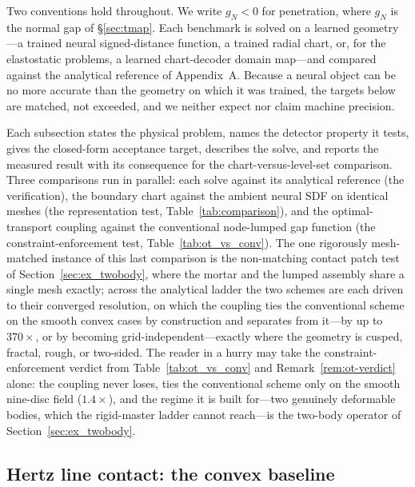 \documentclass{svjour3}                 %
\newcommand{\gn}{g_{\scriptscriptstyle N}}
\begin{document}
Two conventions hold throughout. We write $\gn<0$ for penetration, where $\gn$ is the normal gap of
\S\ref{sec:tmap}. Each benchmark is solved on a learned geometry---a trained neural signed-distance function,
a trained radial chart, or, for the elastostatic problems, a learned chart-decoder domain map---and compared
against the analytical reference of Appendix~A. Because a neural object can be no more accurate than the
geometry on which it was trained, the targets below are matched, not exceeded, and we neither expect nor claim
machine precision.

Each subsection states the physical problem, names the detector property it tests, gives the closed-form
acceptance target, describes the solve, and reports the measured result with its consequence for the
chart-versus-level-set comparison. Three comparisons run in parallel: each solve against its
analytical reference (the verification), the boundary chart against the ambient neural SDF on identical meshes
(the representation test, Table~\ref{tab:comparison}), and the optimal-transport coupling against the conventional
node-lumped gap function (the constraint-enforcement test, Table~\ref{tab:ot_vs_conv}). The one rigorously
mesh-matched instance of this last comparison is the non-matching contact patch test of
Section~\ref{sec:ex_twobody}, where the mortar and the lumped assembly share a single mesh exactly; across the
analytical ladder the two schemes are each driven to their converged resolution, on which the coupling ties the
conventional scheme on the smooth convex cases by construction and separates from it---by up to $370\times$, or by
becoming grid-independent---exactly where the geometry is cusped, fractal, rough, or two-sided. The reader in a
hurry may take the constraint-enforcement verdict from Table~\ref{tab:ot_vs_conv} and Remark~\ref{rem:ot-verdict}
alone: the coupling never loses, ties the conventional scheme only on the smooth nine-disc field ($1.4\times$),
and the regime it is built for---two genuinely deformable bodies, which the rigid-master ladder cannot
reach---is the two-body operator of Section~\ref{sec:ex_twobody}.

\subsection{Hertz line contact: the convex baseline}\label{sec:ex_hertz}
\end{document}

